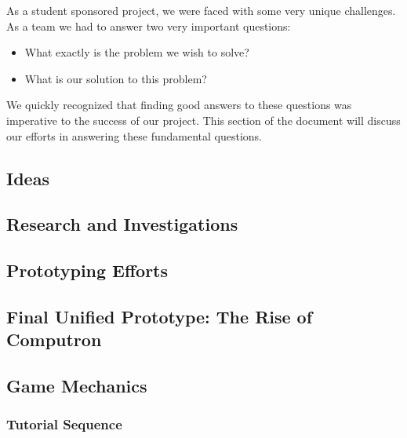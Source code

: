 As a student sponsored project, we were faced with some very unique
challenges. As a team we had to answer two very important questions:
\begin{itemize}
	\item What exactly is the problem we wish to solve?
	\item What is our solution to this problem?
\end{itemize}

We quickly recognized that finding good answers to these questions was imperative to the success of our project. This section of the document will discuss our efforts in answering these fundamental questions.

\subsection{Ideas}
	
\newpage

\subsection{Research and Investigations}
	
\newpage

\subsection{Prototyping Efforts}
	
\newpage

\subsection{Final Unified Prototype: The Rise of Computron}
	
\newpage

\subsection{Game Mechanics}
\subsubsection{Tutorial Sequence}
\label{section:tutorial}
	
\newpage
